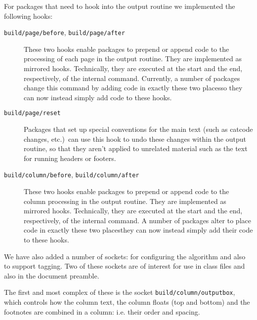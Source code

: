 \documentclass{ltnews}
\providecommand\Dash {\unskip \textemdash}
\providecommand\hook[1]{\texttt{#1}}
\providecommand\socket[1]{\texttt{#1}}
\begin{document}
For packages that need to hook into the output routine we implemented the following hooks:
\begin{description}

\item[\hook{build/page/before}, \hook{build/page/after}]

   These two hooks enable packages to prepend or append code to the
   processing of each page in the output routine. They are implemented
   as mirrored hooks.  Technically, they are executed at the start and
   the end, respectively, of the internal \LaTeXe{} 
   command.  Currently, a number of packages change this command by
   adding code in exactly these two places\Dash so they can now
   instead simply add code to these hooks.

 \item[\hook{build/page/reset}]

   Packages that set up special conventions for the main text (such as
   catcode changes, etc.)\ can use this hook to undo these changes
   within the output routine, so that they aren't applied to unrelated
   material such as the text for running headers or footers.

\item[\hook{build/column/before}, \hook{build/column/after}]

  These two hooks enable packages to prepend or append code to the
  column processing in the output routine. They are implemented as
  mirrored hooks.  Technically, they are executed at the start and the
  end, respectively, of the internal \LaTeXe{}  command.
  A number of packages alter  to place code in exactly
  these two places\Dash they can now instead simply add their code to
  these hooks.
  
\end{description}

We have also added a number of sockets: for configuring the algorithm and also to
support tagging. 
Two of these sockets are of interest for use in
class files and also in the document preamble. 

The first and most complex of these is the socket \socket{build/column/outputbox}, 
which controls how the
column text, the column floats (top and bottom) and the footnotes are
combined in a column: i.e. their order and spacing. 
\end{document}
